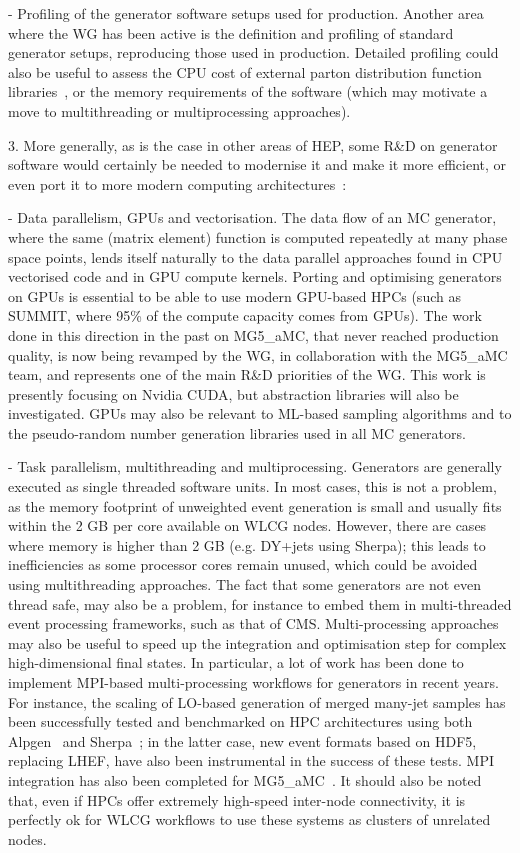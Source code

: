\documentclass[11pt,a4paper]{article}
\begin{document}
- {Profiling of the generator software setups used for production}.
Another area where the WG has been active is the definition and
profiling of standard generator setups, reproducing those used in
production. Detailed profiling could also be useful to assess the CPU
cost of external parton distribution function libraries~\cite{Kon20}, or
the memory requirements of the software (which may motivate a move to
multithreading or multiprocessing approaches).

3. More generally, as is the case in other areas of HEP, some R\&D on
generator software would certainly be needed to modernise it and make it
more efficient, or even port it to more modern computing 
architectures~\cite{Bau13,Alves:2017she}:

- {Data parallelism, GPUs and vectorisation}. The data flow of an MC
generator, where the same (matrix element) function is computed
repeatedly at many phase space points, lends itself naturally to the
data parallel approaches found in CPU vectorised code and in GPU compute
kernels. Porting and optimising generators on GPUs is essential to be
able to use modern GPU-based HPCs (such as SUMMIT, where 95\% of the
compute capacity comes from GPUs). The work done in this direction in
the past on MG5\_aMC, that never reached production quality, is now
being revamped by the WG, in collaboration with the MG5\_aMC team, and
represents one of the main R\&D priorities of the WG. This work is
presently focusing on Nvidia CUDA, but abstraction libraries will also
be investigated. GPUs may also be relevant to ML-based sampling
algorithms and to the pseudo-random number generation libraries used in
all MC generators.

- {Task parallelism, multithreading and multiprocessing}. Generators are
generally executed as single threaded software units. In most cases,
this is not a problem, as the memory footprint of unweighted event
generation is small and usually fits within the 2 GB per core available
on WLCG nodes. However, there are cases where memory is higher than 2 GB
(e.g. DY+jets using Sherpa); this leads to inefficiencies as some
processor cores remain unused, which could be avoided using
multithreading approaches. The fact that some generators are not even
thread safe, may also be a problem, for instance to embed them in
multi-threaded event processing frameworks, such as that of CMS.
Multi-processing approaches may also be useful to speed up the
integration and optimisation step for complex high-dimensional final
states. In particular, a lot of work has been done to implement
MPI-based multi-processing workflows for generators in recent years. For
instance, the scaling of LO-based generation of merged many-jet samples
has been successfully tested and benchmarked on HPC architectures using
both Alpgen~\cite{Chi17} and Sherpa~\cite{Hoe19}; in the latter case, new
event formats based on HDF5, replacing LHEF, have also been instrumental
in the success of these tests. MPI integration has also been completed
for MG5\_aMC~\cite{Mat18}. It should also be noted that, even if HPCs
offer extremely high-speed inter-node connectivity, it is perfectly ok
for WLCG workflows to use these systems as clusters of unrelated nodes.
\end{document}
